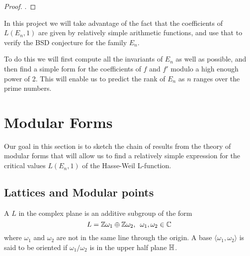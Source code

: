 \documentclass[12pt, a4paper]{report}
\begin{document}
\begin{proof}
  \cite[See][pages 325-328]{Tunnell}. 
\end{proof}
  
In this project we will take advantage of the fact that the coefficients of
$L(E_n,1)$ are given by relatively simple arithmetic functions, and use that
to verify the BSD conjecture for the family $E_n$.

To do this we will first compute all the invariants of $E_n$ as well as
possible, and then find a simple form for the coefficients of $f$ and $f'$ modulo
a high enough power of 2. This will enable us to predict the rank of $E_n$ as
$n$ ranges over the prime numbers.

\newpage

\chapter{Modular Forms}

Our goal in this section is to sketch the chain of results from the theory of
modular forms that will allow us to find a relatively simple expression for the
critical values $L(E_n,1)$ of the Hasse-Weil L-function. 

\section{Lattices and Modular points}

\begin{defn}
  A  $L$ in the complex plane is an additive subgroup of the form
  \[L = {\mathbb Z}\omega_1 \oplus {\mathbb Z}\omega_2, \,\,\, \omega_1, \omega_2 \in {\mathbb C} \]
  where $\omega_1$ and $\omega_2$ are not in the same line through the origin.
  A base $\langle \omega_1, \omega_2 \rangle$ is said to be oriented if
  $\omega_1/\omega_2$ is in the upper half plane $\mathbb{H}$.
\end{defn}
\end{document}
